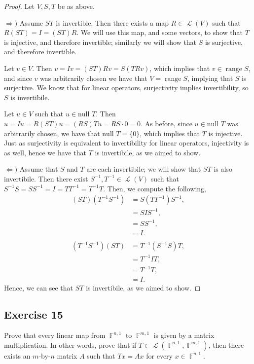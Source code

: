 \documentclass[letterpaper, 12pt]{amsart}
\DeclareMathOperator{\F}{\mathbb{F}}				%
\DeclareMathOperator{\Ell}{\mathscr{L}}				%
\renewcommand{\null}{\text{null }}					%
\DeclareMathOperator{\range}{\text{range }}			%
\theoremstyle{definition}  							%
\newcommand{\Ra}{\Rightarrow}                   %
\newcommand{\La}{\Leftarrow}                    %
\begin{document}
		\begin{proof}
		Let $V, S, T$ be as above.

		$\Ra)$ Assume $ST$ is invertible.
		Then there exists a map $R \in \Ell(V)$ such that $R(ST) = I = (ST)R$.
		We will use this map, and some vectors, to show that $T$ is injective, and therefore invertible; similarly we will show that $S$ is surjective, and therefore invertible.

		Let $v \in V$.
		Then $v = Iv = (ST)Rv = S(TRv)$, which implies that $v \in \range S$, and since $v$ was arbitrarily chosen we have that $V = \range S$, implying that $S$ is surjective.
		We know that for linear operators, surjectivity implies invertibility, so $S$ is invertibile.

		Let $u \in V$ such that $u \in \null T$.
		Then $u = Iu = R(ST)u = (RS)Tu = RS \cdot 0 = 0$.
		As before, since $u \in \null T$ was arbitrarily chosen, we have that $\null T = \{0\}$, which implies that $T$ is injective.
		Just as surjectivity is equivalent to invertibility for linear operators, injectivity is as well, hence we have that $T$ is invertibile, as we aimed to show.

		$\La)$ Assume that $S$ and $T$ are each invertibile; we will show that $ST$ is also invertibile.
		Then there exist $S^{-1}, T^{-1} \in \Ell(V)$ such that $S^{-1}S = SS^{-1} = I = TT^{-1} = T^{-1}T$.
		Then, we compute the following,
			\begin{align*}
				(ST)(T^{-1}S^{-1}) &= S(TT^{-1})S^{-1}, \\
				&= SIS^{-1}, \\
				&= SS^{-1}, \\
				&= I. \\
				\\
				(T^{-1}S^{-1})(ST) &= T^{-1}(S^{-1}S)T, \\
				&= T^{-1}IT, \\
				&= T^{-1}T, \\
				&= I.
			\end{align*}
		Hence, we can see that $ST$ is invertibile, as we aimed to show.			
		\end{proof}

		\subsection*{Exercise 15}
		Prove that every linear map from $\F^{n,1}$ to $\F^{m,1}$ is given by a matrix multiplication. 
		In other words, prove that if $T \in \Ell(\F^{n,1}, \F^{m,1})$, then there exists an $m$-by-$n$ matrix $A$ such that $Tx = Ax$ for every $x \in \F^{n,1}$.
		
\end{document}

